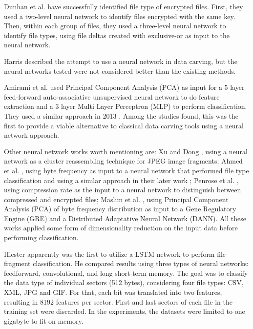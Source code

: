 Dunhan et al. \cite{dunham_classifying_2005} have successfully identified file type of encrypted files. First, they used a two-level neural network to identify files encrypted with the same key. Then, within each group of files, they used a three-level neural network to identify file types, using file deltas created with exclusive-or as input to the neural network. 

Harris \cite{harris_using_2007} described the attempt to use a neural network in data carving, but the neural networks tested were not considered better than the existing methods.

Amirami et al.  \cite{amirani_new_2008} used Principal Component Analysis (PCA) as input for a 5 layer feed-forward auto-associative unsupervised neural network to do feature extraction and a 3 layer Multi Layer Perceptron (MLP) to perform classification. They used a similar approach in 2013 \cite{amirani_feature-based_2013}. 
Among the studies found, this was the first to provide a viable alternative to classical data carving tools using a neural network approach. 

Other neural network works worth mentioning are:
Xu and Dong \cite{xu_reassembling_2009}, using a neural network as a cluster reassembling technique for JPEG image fragments;
Ahmed et al. \cite{ahmed_content-based_2010}, using byte frequency as input to a neural network that performed file type classification and using a similar approach in their later work \cite{ahmed_fast_2011};
Penrose et al. \cite{penrose_approaches_2013}, using compression rate as the input to a neural network to distinguish between compressed and encrypted files;
Maslim et al. \cite{maslim_distributed_2014}, using Principal Component Analysis (PCA) of byte frequency distribution as input to a Gene Regulatory Engine (GRE) and a Distributed Adaptative Neural Network (DANN).
All these works applied some form of dimensionality reduction on the input data before performing classification.

Hiester \cite{hiester_file_2018} apparently was the first to utilize a LSTM network to perform file fragment classification. He compared results using three types of neural networks: feedforward, convolutional, and long short-term memory. The goal was to classify the data type of individual sectors (512 bytes), considering four file types: CSV, XML, JPG and GIF. For that, each bit was translated into two features, resulting in 8192 features per sector. First and last sectors of each file in the training set were discarded. In the experiments, the datasets were limited to one gigabyte to fit on memory.

